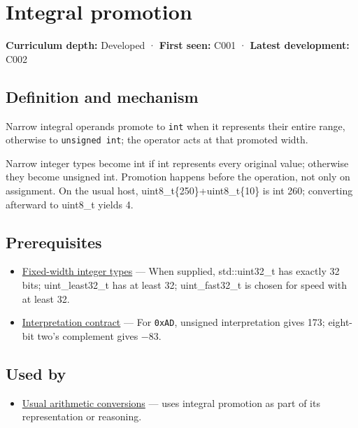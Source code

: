\hypertarget{appendix-45303d03796a}{}
\section{Integral promotion}\label{appendix-45303d03796a-integral-promotion}

\textbf{Curriculum depth:} Developed · \textbf{First seen:} C001 · \textbf{Latest development:} C002

\subsection{Definition and mechanism}\label{appendix-45303d03796a-definition-and-mechanism}

Narrow integral operands promote to \texttt{int} when it represents their entire range, otherwise to \texttt{unsigned\ int}; the operator acts at that promoted width.

Narrow integer types become int if int represents every original value; otherwise they become unsigned int. Promotion happens before the operation, not only on assignment. On the usual host, uint8\_t\{250\}+uint8\_t\{10\} is int 260; converting afterward to uint8\_t yields 4.

\subsection{Prerequisites}\label{appendix-45303d03796a-prerequisites}

\begin{itemize}
\tightlist
\item
  \hyperref[appendix-cc04044b5782]{Fixed-width integer types} --- When supplied, std::uint32\_t has exactly 32 bits; uint\_least32\_t has at least 32; uint\_fast32\_t is chosen for speed with at least 32.
\item
  \hyperref[appendix-f414bd4ed05c]{Interpretation contract} --- For \texttt{0xAD}, unsigned interpretation gives 173; eight-bit two's complement gives −83.
\end{itemize}

\subsection{Used by}\label{appendix-45303d03796a-used-by}

\begin{itemize}
\tightlist
\item
  \hyperref[appendix-5e2d663adf7f]{Usual arithmetic conversions} --- uses integral promotion as part of its representation or reasoning.
\end{itemize}

